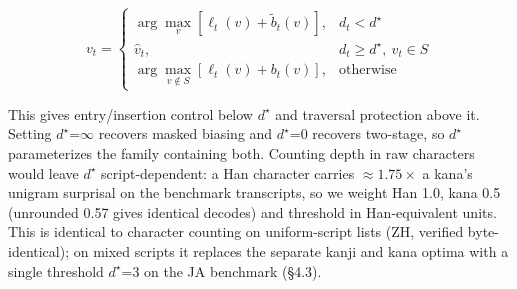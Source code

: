 \documentclass{article}
\begin{document}


\begin{equation*}
v_t =
\begin{cases}
\arg\max_v \left[\ell_t(v) + \tilde{b}_t(v)\right], & d_t < d^\star\\[3pt]
\hat{v}_t, & d_t \ge d^\star,\ \hat{v}_t \in S\\[3pt]
\arg\max_{v \notin S} \left[\ell_t(v) + b_t(v)\right], & \text{otherwise}
\end{cases}
\end{equation*}

This gives entry/insertion control below $d^\star$ and traversal protection above it. Setting $d^\star$=$\infty$ recovers masked biasing and $d^\star$=0 recovers two-stage, so $d^\star$ parameterizes the family containing both. Counting depth in raw characters would leave $d^\star$ script-dependent: a Han character carries $\approx$$1.75\times$ a kana's unigram surprisal on the benchmark transcripts, so we weight Han 1.0, kana 0.5 (unrounded 0.57 gives identical decodes) and threshold in Han-equivalent units. This is identical to character counting on uniform-script lists (ZH, verified byte-identical); on mixed scripts it replaces the separate kanji and kana optima with a single threshold $d^\star$=3 on the JA benchmark (§4.3).

\end{document}
